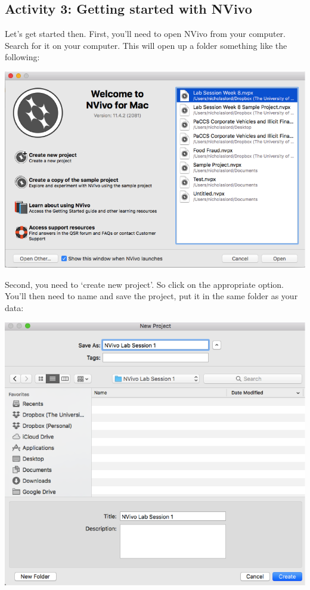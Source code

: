 \documentclass[]{book}
\theoremstyle{definition}
\theoremstyle{definition}
\theoremstyle{definition}
\theoremstyle{remark}
\begin{document}
\hypertarget{activity-3-getting-started-with-nvivo}{%
\subsection{Activity 3: Getting started with
NVivo}\label{activity-3-getting-started-with-nvivo}}

Let's get started then. First, you'll need to open NVivo from your
computer. Search for it on your computer. This will open up a folder
something like the following:

\includegraphics{imgs/qual_05.png}

Second, you need to `create new project'. So click on the appropriate
option. You'll then need to name and save the project, put it in the
same folder as your data:

\includegraphics{imgs/qual_06.png}
\end{document}
